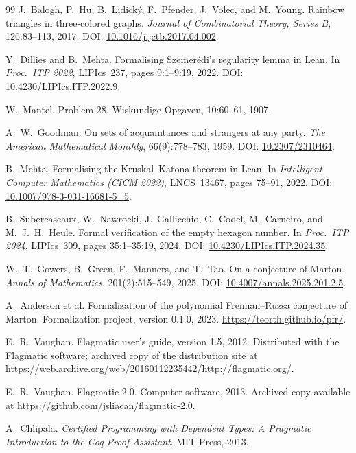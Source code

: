 \documentclass{article}
\newcommand\DOI[1]{DOI: \href{https://doi.org/#1}{#1}}
\begin{document}
\begin{thebibliography}{99}
J.~Balogh, P.~Hu, B.~Lidick\'{y}, F.~Pfender, J.~Volec, and M.~Young.
\newblock Rainbow triangles in three-colored graphs.
\newblock \textit{Journal of Combinatorial Theory, Series B}, 126:83--113,
  2017. \DOI{10.1016/j.jctb.2017.04.002}.

Y.~Dillies and B.~Mehta.
\newblock Formalising Szemer\'{e}di's regularity lemma in Lean.
\newblock In \textit{Proc.\ ITP 2022}, LIPIcs~237, pages 9:1--9:19, 2022.
  \DOI{10.4230/LIPIcs.ITP.2022.9}.

W.~Mantel, Problem 28, Wiskundige Opgaven, 10:60--61, 1907.

A.~W.~Goodman.
\newblock On sets of acquaintances and strangers at any party.
\newblock \textit{The American Mathematical Monthly}, 66(9):778--783, 1959.
  \DOI{10.2307/2310464}.

B.~Mehta.
\newblock Formalising the Kruskal--Katona theorem in Lean.
\newblock In \textit{Intelligent Computer Mathematics (CICM 2022)},
  LNCS~13467, pages 75--91, 2022.
  \DOI{10.1007/978-3-031-16681-5\_5}.

B.~Subercaseaux, W.~Nawrocki, J.~Gallicchio, C.~Codel, M.~Carneiro, and
  M.~J.~H.~Heule.
\newblock Formal verification of the empty hexagon number.
\newblock In \textit{Proc.\ ITP 2024}, LIPIcs~309, pages 35:1--35:19, 2024.
  \DOI{10.4230/LIPIcs.ITP.2024.35}.

W.~T.~Gowers, B.~Green, F.~Manners, and T.~Tao.
\newblock On a conjecture of Marton.
\newblock \textit{Annals of Mathematics}, 201(2):515--549, 2025.
  \DOI{10.4007/annals.2025.201.2.5}.

A.~Anderson et al.
\newblock Formalization of the polynomial Freiman--Ruzsa conjecture of Marton.
\newblock Formalization project, version 0.1.0, 2023.
  \url{https://teorth.github.io/pfr/}.

E.~R.~Vaughan.
\newblock Flagmatic user's guide, version 1.5, 2012.
\newblock Distributed with the Flagmatic software; archived copy of the
  distribution site at
  \url{https://web.archive.org/web/20160112235442/http://flagmatic.org/}.

E.~R.~Vaughan.
\newblock Flagmatic 2.0.
\newblock Computer software, 2013. Archived copy available at
  \url{https://github.com/jsliacan/flagmatic-2.0}.

A.~Chlipala.
\newblock \textit{Certified Programming with Dependent Types: A Pragmatic
  Introduction to the Coq Proof Assistant}.
\newblock MIT Press, 2013.


\end{thebibliography}
\end{document}
